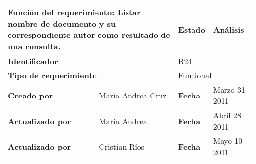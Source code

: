 %
\begin{center}
\begin{longtable}{|p{}|p{}|p{}|p{}|}
\hline
\multicolumn{2}{|p{0.45\textwidth}|}{{\bf {Función del requerimiento:}}
Listar nombre de documento y su correspondiente autor como resultado de una consulta. } & {\bf{ Estado}} & Análisis \\
\hline
\multicolumn{2}{|p{0.45\textwidth}}{\bf Identificador} &
\multicolumn{2}{|p{0.45\textwidth}|}{R24} \\
\hline
\multicolumn{2}{|p{0.45\textwidth}}{\bf {Tipo de requerimiento}} &
\multicolumn{2}{|p{0.45\textwidth}|}{Funcional}\\
\hline
\bf {Creado por} & María Andrea Cruz & \bf {Fecha } & Marzo 31 2011 \\
\hline
\bf {Actualizado por} & María Andrea & \bf {Fecha }& Abril  28 2011\\
\hline
\bf {Actualizado por} & Cristian Ríos & \bf {Fecha }& Mayo 10 2011\\


\end{longtable}
\end{center}
